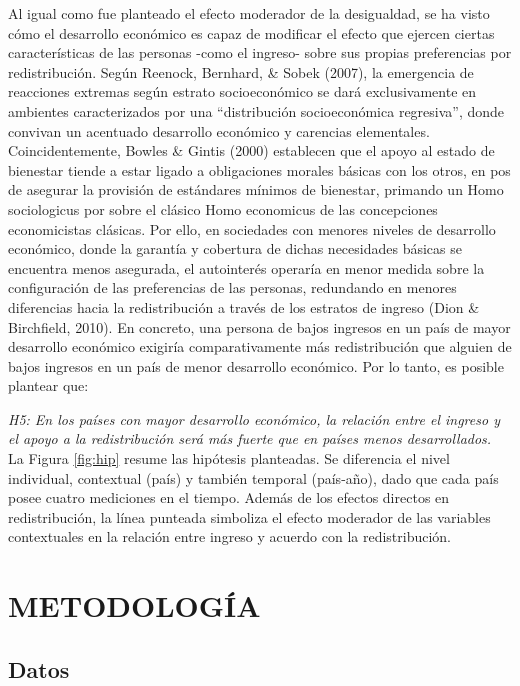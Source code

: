 \documentclass[12pt,letterpaper]{article}
\begin{document}
Al igual como fue planteado el efecto moderador de la desigualdad, se ha visto cómo el desarrollo económico es capaz de modificar el efecto que ejercen ciertas características de las personas -como el ingreso- sobre sus propias preferencias por redistribución. Según Reenock, Bernhard, \& Sobek (2007), la emergencia de reacciones extremas según estrato socioeconómico se dará exclusivamente en ambientes caracterizados por una “distribución socioeconómica regresiva”, donde convivan un acentuado desarrollo económico y carencias elementales. Coincidentemente, Bowles \& Gintis (2000) establecen que el apoyo al estado de bienestar tiende a estar ligado a obligaciones morales básicas con los otros, en pos de asegurar la provisión de estándares mínimos de bienestar, primando un Homo sociologicus por sobre el clásico Homo economicus de las concepciones economicistas clásicas. Por ello, en sociedades con menores niveles de desarrollo económico, donde la garantía y cobertura de dichas necesidades básicas se encuentra menos asegurada, el autointerés operaría en menor medida sobre la configuración de las preferencias de las personas, redundando en menores diferencias hacia la redistribución a través de los estratos de ingreso (Dion \& Birchfield, 2010). En concreto, una persona de bajos ingresos en un país de mayor desarrollo económico exigiría comparativamente más redistribución que alguien de bajos ingresos en un país de menor desarrollo económico. Por lo tanto, es posible plantear que: 

\textit{H5: En los países con mayor desarrollo económico, la relación entre el ingreso y el apoyo a la redistribución será más fuerte que en países menos desarrollados.}\\

La Figura \ref{fig:hip} resume las hipótesis planteadas. Se diferencia el nivel individual, contextual (país) y también temporal (país-año), dado que cada país posee cuatro mediciones en el tiempo. Además de los efectos directos en redistribución, la línea punteada simboliza el efecto moderador de las variables contextuales en la relación entre ingreso y acuerdo con la redistribución. 

\section{METODOLOGÍA \label{sec:sec3}}

\subsection{Datos \label{sec:sec31}}
\end{document}
